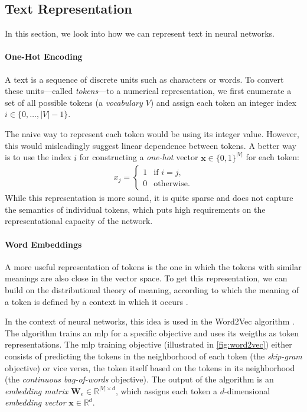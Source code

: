 {\subsection{Text Representation}
\label{sec:text-repr}
In this section, we look into how we can represent text in neural networks.

\paragraph{One-Hot Encoding}
A text is a sequence of discrete units such as characters or words. To convert these units---called \textit{tokens}---to a numerical representation, we first enumerate a set of all possible tokens (a \textit{vocabulary} $V$) and assign each token an integer index $i \in \{0, \ldots, |V|-1\}$.

The naive way to represent each token would be using its integer value. However, this would misleadingly suggest linear dependence between tokens. A better way is to use the index $i$ for constructing a \textit{one-hot} vector $\mathbf{x} \in \{0,1\}^{|V|} $ for each token:
\begin{align}
    x_j = \begin{cases}
        1 & \text{if } i = j, \\
        0 & \text{otherwise}.
    \end{cases}
\end{align}
While this representation is more sound, it is quite sparse and does not capture the semantics of individual tokens, which puts high requirements on the representational capacity of the network.

\paragraph{Word Embeddings} A more useful representation of tokens is the one in which the tokens with similar meanings are also close in the vector space. To get this representation, we can build on the distributional theory of meaning, according to which the meaning of a token is defined by a context in which it occurs \cite{harris1954distributional,firth1957synopsis}.

In the context of neural networks, this idea is used in the Word2Vec algorithm \cite{mikolov2013distributed}. The algorithm trains an \ac{mlp} for a specific objective and uses its weigths as token representations. The \ac{mlp} training objective (illustrated in \autoref{fig:word2vec}) either consists of predicting the tokens in the neighborhood of each token (the \emph{skip-gram} objective) or vice versa, the token itself based on the tokens in its neighborhood (the \emph{continuous bag-of-words} objective). The output of the algorithm is an \textit{embedding matrix} $\mathbf{W}_e \in \mathbb{R}^{|V|\times d}$, which assigns each token a $d$-dimensional \textit{embedding vector} $\mathbf{x} \in \mathbb{R}^{d}$.

}
